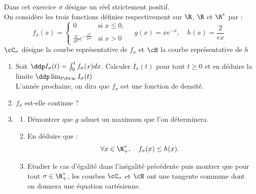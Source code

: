\begin{exercice}[G2E 2019]
Dans cet exercice $\sigma$ désigne un réel strictement positif. \\

On considère les trois fonctions définies respectivement sur $\R$, $\R$ et $\R^*$ par :
$$
f_\sigma (x) = \left\{\begin{array}{lr}
0 & \text{si $x\leq 0,$}\\
\frac{x}{\sigma^2}e^{-\frac{x^2}{2\sigma^2}} &\text{si $x> 0$}
\end{array}\right. \quad g(x) =xe^{-x}, \quad h(x) = \frac{2}{ex}
$$
$\cC_\sigma$ désigne la courbe représentative de $f_\sigma$ et $\cH$ la courbe représentative de $h$
\begin{enumerate}
\item Soit $\ddp I_\sigma(t) = \int_0^t f_\sigma(x) dx$. Calculer $I_\sigma(t) $ pour tout $t\geq 0$ et en déduire la limite $\ddp \lim_{t\tv \infty} I_\sigma(t) $ \\
{\footnotesize L'année prochaine, on dira que $f_\sigma$ est une fonction de densité.}
\item $f_\sigma$ est-elle continue ? 
\item \begin{enumerate}
\item Démontrer que $g$ admet un maximum que l'on déterminera. 
\item En déduire que :
$$\forall x\in \R_+^*, \quad f_\sigma (x) \leq h(x).$$
\item Etudier le cas d'égalité dans l'inégalité précédente puis montrer que pour tout $\sigma \in \R^*_+$, les courbes $\cC_\sigma$ et $\cH$ ont une tangente commune dont on donnera une équation cartésienne. 
\end{enumerate}
\end{enumerate}

\end{exercice}

